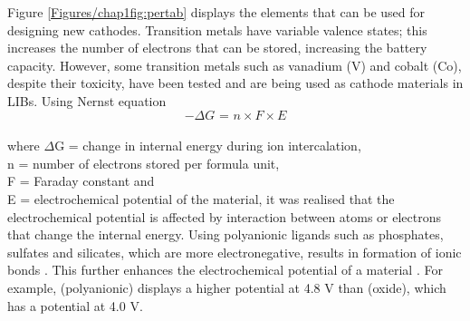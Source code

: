 Figure \ref{Figures/chap1fig:pertab} displays the elements that can be used for designing new cathodes. Transition metals have variable valence states; this increases the number of electrons that can be stored, increasing the battery capacity. However, some transition metals such as vanadium (V) and cobalt (Co), despite their toxicity, have been tested and are being used as cathode materials in LIBs.
Using Nernst equation
\begin{equation} \label{eq6}
    -\Delta G \text{ = } n \times F \times E
\end{equation}\\
where $\Delta$G = change in internal energy during ion intercalation,\\
n = number of electrons stored per formula unit,\\
F = Faraday constant and\\
E = electrochemical potential of the material, it was realised that the electrochemical potential is affected by interaction between atoms or electrons that change the internal energy. Using polyanionic ligands such as phosphates, sulfates and silicates, which are more electronegative, results in formation of ionic bonds \cite{liu_understanding_2016}. This further enhances the electrochemical potential of a material \cite{melot_design_2013}. For example,  (polyanionic) displays a higher potential at 4.8 V than  (oxide), which has a potential at 4.0 V\cite{masquelier_polyanionic_2013}. 

